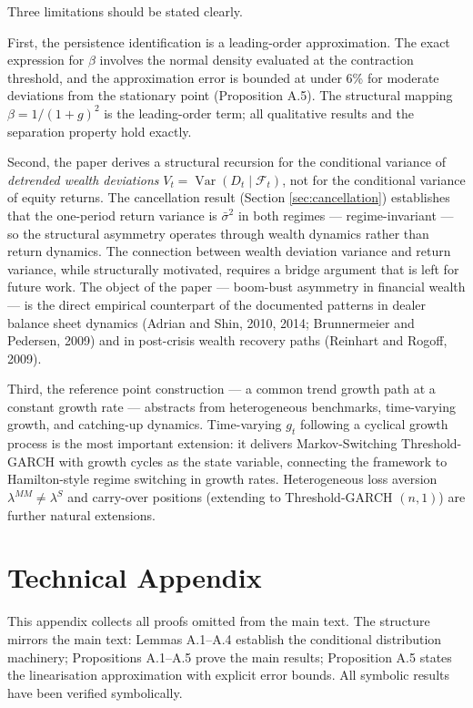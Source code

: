 \documentclass[12pt,a4paper]{article}
\theoremstyle{definition}
\begin{document}
Three limitations should be stated clearly.

First, the persistence identification is a leading-order approximation.
The exact expression for $\beta$ involves the normal density evaluated
at the contraction threshold, and the approximation error is bounded at
under 6\% for moderate deviations from the stationary point (Proposition
A.5). The structural mapping $\beta = 1/(1+g)^2$ is the leading-order
term; all qualitative results and the separation property hold exactly.

Second, the paper derives a structural recursion for the conditional
variance of \emph{detrended wealth deviations} $V_t =
\operatorname{Var}(D_t \mid \mathcal{F}_t)$, not for the conditional
variance of equity returns. The cancellation result (Section
\ref{sec:cancellation}) establishes that the one-period return variance
is $\bar\sigma^2$ in both regimes --- regime-invariant --- so the
structural asymmetry operates through wealth dynamics rather than return
dynamics. The connection between wealth deviation variance and return
variance, while structurally motivated, requires a bridge argument that
is left for future work. The object of the paper --- boom-bust asymmetry
in financial wealth --- is the direct empirical counterpart of the
documented patterns in dealer balance sheet dynamics (Adrian and Shin,
2010, 2014; Brunnermeier and Pedersen, 2009) and in post-crisis wealth
recovery paths (Reinhart and Rogoff, 2009).

Third, the reference point construction --- a common trend growth path
at a constant growth rate --- abstracts from heterogeneous benchmarks,
time-varying growth, and catching-up dynamics. Time-varying $g_t$
following a cyclical growth process is the most important extension:
it delivers Markov-Switching Threshold-GARCH with growth cycles as the
state variable, connecting the framework to Hamilton-style regime
switching in growth rates. Heterogeneous loss aversion $\lambda^{MM}
\neq \lambda^S$ and carry-over positions (extending to Threshold-GARCH
$(n,1)$) are further natural extensions.


\appendix

\section{Technical Appendix}
\label{app:proofs}

This appendix collects all proofs omitted from the main text. The
structure mirrors the main text: Lemmas A.1--A.4 establish the
conditional distribution machinery; Propositions A.1--A.5 prove
the main results; Proposition A.5 states the linearisation
approximation with explicit error bounds. All symbolic results
have been verified symbolically.
\end{document}

